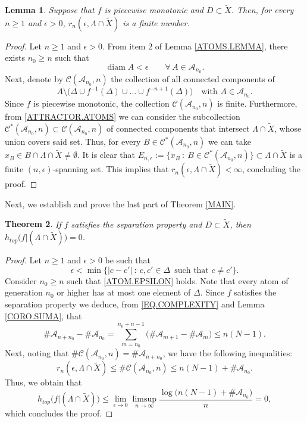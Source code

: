 \documentclass[a4paper]{article}
\newtheorem{theorem}{Theorem}[section]
\newtheorem{lemma}[theorem]{Lemma}
\DeclareMathOperator{\diam}{diam}
\begin{document}
\begin{lemma}\label{WELL}
    Suppose that $f$ is piecewise monotonic and $D\subset\widetilde X$. Then, for every $n\geq1$ and $\epsilon>0$, $r_n(\epsilon,\Lambda\cap\widetilde X)$ is a finite number.
\end{lemma}
\begin{proof}
Let $n\geq1$ and $\epsilon>0$. From item 2 of Lemma \ref{ATOMS.LEMMA}, there exists $n_0\geq n$ such that
    \begin{equation}
        \diam A<\epsilon\qquad \forall\,A\in\mathcal A_{n_0}. \label{ATOM.EPSILON}
    \end{equation}
    Next, denote by $\mathcal C(\mathcal A_{n_0},n)$ the collection of all connected components of
    \[
        A\setminus\big(\Delta\cup f^{-1}(\Delta)\cup\ldots\cup f^{-n+1}(\Delta)\big)\quad\text{with $A \in \mathcal A_{n_0}$.}
    \]
{Since $f$ is piecewise monotonic, the collection $\mathcal C(\mathcal A_{n_0},n)$ is finite. Furthermore, from \eqref{ATTRACTOR.ATOMS} we can consider the subcollection $\mathcal C^*(\mathcal A_{n_0},n)\subset\mathcal C(\mathcal A_{n_0},n)$ of connected components that intersect $\Lambda\cap\widetilde X$, whose union covers said set. Thus, for every $B\in \mathcal C^*(\mathcal A_{n_0},n)$ we can take $x_B\in B\cap\Lambda\cap\widetilde X\neq\emptyset$. It is clear that $E_{n,\epsilon}:=\{x_B\ :\ B\in\mathcal C^*(\mathcal A_{n_0},n)\}\subset\Lambda\cap\widetilde X$ is a finite $(n,\epsilon)$-spanning set. This implies that $r_n(\epsilon,\Lambda\cap\widetilde X)<\infty$, concluding the proof.}
\end{proof}


Next, we establish and prove the last part of Theorem \ref{MAIN}.

\begin{theorem}\label{BOWEN}
    If $f$ satisfies the separation property and $D\subset\widetilde X$, then $h_{top}\big(f|(\Lambda\cap\widetilde X)\big)=0$.
\end{theorem}
\begin{proof}
    Let $n\geq1$ and $\epsilon>0$ be such that 
    \[
        \epsilon<\min\!\big\{|c-c'|\ :\ c,c'\in\Delta \,\text{ such that } c\neq c' \big\}.
    \]
    Consider $n_0\geq n$ such that \eqref{ATOM.EPSILON} holds. Note that every atom of generation $n_0$ or higher has at most one element of $\Delta$. Since $f$ satisfies the {separation property we deduce, from \eqref{EQ.COMPLEXITY} and Lemma \ref{CORO.SUMA},} that  
    \[
        \#\mathcal A_{n+n_0}-\#\mathcal A_{n_0}=\sum_{m=n_0}^{n_0+n-1}\big(\#\mathcal A_{m+1}-\#\mathcal A_{m}\big)\leq n(N-1). 
    \]
    Next, noting that $\#\mathcal C(\mathcal A_{n_0},n)=\#\mathcal A_{n+n_0}$, we have the following inequalities:
    \[
        r_n(\epsilon,\Lambda\cap\widetilde X) \leq \#\mathcal C(\mathcal A_{n_0},n)\leq n(N-1)+\#\mathcal A_{n_0}.
    \]
    Thus, we obtain that
    \[
        h_{top}\big(f|(\Lambda\cap\widetilde X)\big)\leq \lim_{\epsilon\to0}\limsup_{n\to\infty}\frac{\log \big(n(N-1)+\#\mathcal A_{n_0}\big)}{n}=0,
    \]
    which concludes the proof.
\end{proof}
\end{document}
